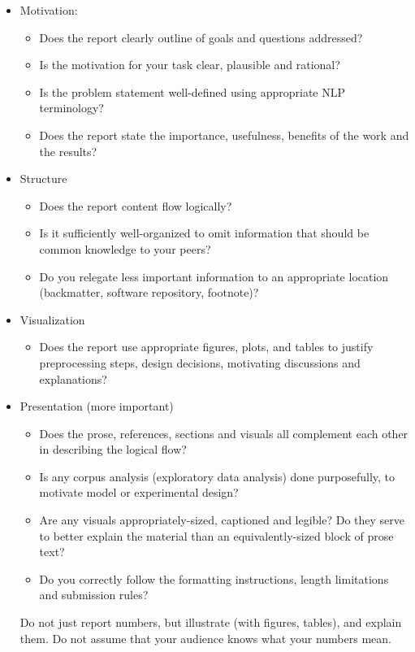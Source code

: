 \documentclass[11pt]{article}
\begin{document}
\begin{itemize}
    \item Motivation: 
    \begin{itemize}
        \item Does the report clearly outline of goals and questions addressed?
        \item Is the motivation for your task clear, plausible and rational?  
        \item Is the problem statement well-defined using appropriate NLP terminology? 
        \item Does the report state the importance, usefulness, benefits of the work and the results?
    \end{itemize}
    \item Structure
    \begin{itemize}
        \item Does the report content flow logically? 
        \item Is it sufficiently well-organized to omit information that should be common knowledge to your peers?  
        \item Do you relegate less important information to an appropriate location (backmatter, software repository, footnote)? 
    \end{itemize}
    \item Visualization
    \begin{itemize}
        \item Does the report use appropriate figures, plots, and tables to justify preprocessing steps, design decisions, motivating discussions and explanations?
    \end{itemize}
    \item Presentation (more important)
    \begin{itemize}
        \item Does the prose, references, sections and visuals all complement each other in describing the logical flow?
        \item Is any corpus analysis (exploratory data analysis) done purposefully, to motivate model or experimental design?
        \item Are any visuals appropriately-sized, captioned and legible? Do they serve to better explain the material than an equivalently-sized block of prose text?
        \item Do you correctly follow the formatting instructions, length limitations and submission rules?
    \end{itemize}
    Do not just report numbers, but illustrate (with figures, tables), and explain them. Do not assume that your audience knows what your numbers mean.
    
\end{itemize}
\end{document}
